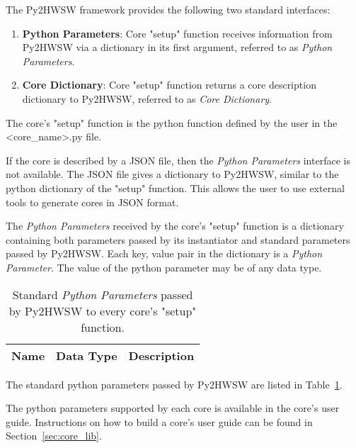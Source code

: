 %

The Py2HWSW framework provides the following two standard interfaces:
\begin{enumerate}
  \item \textbf{Python Parameters}: Core "setup" function receives information from Py2HWSW via a dictionary in its first argument, referred to as \textit{Python Parameters}.
  \item \textbf{Core Dictionary}: Core "setup" function returns a core description dictionary to Py2HWSW, referred to as \textit{Core Dictionary}.
\end{enumerate}

The core's "setup" function is the python function defined by the user in the <core\_name>.py file.

If the core is described by a JSON file, then the \textit{Python Parameters} interface is not available.
The JSON file gives a dictionary to Py2HWSW, similar to the python dictionary of the "setup" function.
This allows the user to use external tools to generate cores in JSON format.

%
%

The \textit{Python Parameters} received by the core's "setup" function is a dictionary containing both parameters passed by its instantiator and standard parameters passed by Py2HWSW.
Each key, value pair in the dictionary is a \textit{Python Parameter}.
The value of the python parameter may be of any data type.

\begin{table}[H]
  \centering
  \begin{tabularx}{\textwidth}{|l|l|X|}

    \hline
    \rowcolor{iob-green}
    {\bf Name} & {\bf Data Type} & {\bf Description}  \\ \hline \hline


  \end{tabularx}
  \caption{Standard \textit{Python Parameters} passed by Py2HWSW to every core's "setup" function.}
  \label{py2hwsw_py_params_tab}
\end{table}

The standard python parameters passed by Py2HWSW are listed in Table~\ref{py2hwsw_py_params_tab}.

The python parameters supported by each core is available in the core's user guide.
Instructions on how to build a core's user guide can be found in Section~\ref{sec:core_lib}. 


